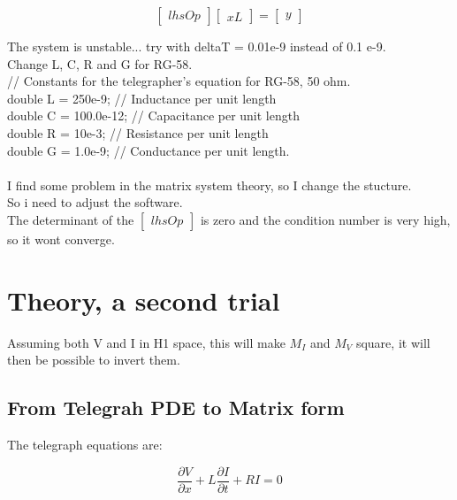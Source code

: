 \documentclass[12pt, letterpaper]{article}
\begin{document}
 \begin{equation}
	\begin{bmatrix}
		lhsOp
	\end{bmatrix}
	\begin{bmatrix}
		xL
	\end{bmatrix}
	=
	\begin{bmatrix}
		y
	\end{bmatrix}
\end{equation}




\begin{mdframed}
The system is unstable... try with deltaT = 0.01e-9 instead of 0.1 e-9.\\
Change L, C, R and G for RG-58.\\
// Constants for the telegrapher’s equation for RG-58, 50 ohm.\\
double L = 250e-9;  // Inductance per unit length\\
double C = 100.0e-12; // Capacitance per unit length\\
double R = 10e-3;  // Resistance per unit length\\
double G = 1.0e-9;  // Conductance per unit length.\\
\\
I find some problem in the matrix system theory, so I change the stucture.\\
So i need to adjust the software.\\

The determinant of the $\begin{bmatrix} lhsOp \end{bmatrix}$ is zero and the condition number is very high, so it wont converge.
  \end{mdframed}
  
  
  \section{Theory, a second trial}
  Assuming both V and I in H1 space, this will make $M_I$ and $M_V$ square, it will then be possible to invert them.
  
  \subsection{From Telegrah PDE to Matrix form}
  
  The telegraph equations are:
  
  \begin{equation}\frac{\partial{V}}{\partial{x}} + L \frac{\partial{I}}{\partial{t}} + R I = 0\end{equation}
  
\end{document}
